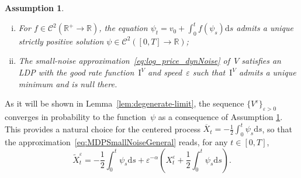 \documentclass{amsart}[11pt]
\numberwithin{equation}{section}
\numberwithin{theorem}{subsection}
\numberwithin{proposition}{subsection}
\numberwithin{definition}{subsection}
\numberwithin{lemma}{subsection}
\newtheorem*{remark}{Remark}
\newtheorem{assumption}{Assumption}
\numberwithin{assumption}{subsection}
\newcommand{\Cc}{\mathcal{C}}
\newcommand{\RR}{\mathbb{R}}
\newcommand{\R}{\RR}
\newcommand{\D}{\mathrm{d}}
\newcommand{\IIV}{\mathrm{I}^{V}}
\newcommand{\eps}{\varepsilon}
\begin{document}
\begin{assumption}\label{ass:SDE_V}\ 
\begin{enumerate}[i)]
    \item For $f\in \Cc^2(\RR^{+}\to\RR)$, 
    the equation $\psi_t = v_0 + \int_0^t f(\psi_s)\D s$ admits a unique strictly positive solution $\psi\in\Cc^2([0,T]\to\R)$;
    \item The small-noise approximation~\eqref{eq:log_price_dynNoise} of~$V$ satisfies an LDP with the good rate function~$\IIV$ and speed~$\eps$ such that~$\IIV$ admits a unique minimum and is null there.
\end{enumerate}
\end{assumption}
As it will be shown in Lemma~\ref{lem:degenerate-limit}, 
the sequence $\{V^\eps\}_{\eps>0}$ converges in probability to the function~$\psi$ as a consequence of Assumption \ref{ass:SDE_V}. 
This provides a natural choice for the centered process 
${\overline{X}_t = -\frac{1}{2}\int_0^t\psi_s\D s}$,
so that the approximation~\eqref{eq:MDPSmallNoiseGeneral}
reads, for any $t\in [0,T]$,
\begin{equation}\label{eq:MDPSmallNoiseX}
\widetilde{X}^\eps_t = -\frac{1}{2} \int_0^t\psi_s \D s + \eps^{-\alpha}\left(X^{\eps}_t + \frac{1}{2} \int_0^t\psi_s \D s\right).
\end{equation}
\end{document}
